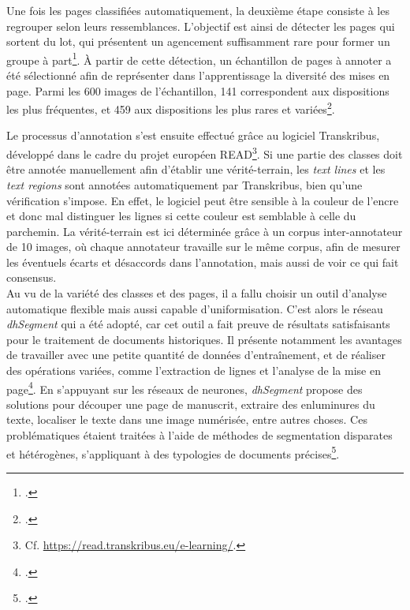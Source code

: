 \documentclass[a4paper,12pt,twoside]{book}
\begin{document}
    Une fois les pages classifiées automatiquement, la deuxième étape consiste à les regrouper selon leurs ressemblances. L'objectif est ainsi de détecter les pages qui sortent du lot, qui présentent un agencement suffisamment rare pour former un groupe à part\footcite[p. 8]{annotated_dataset_book_hours}. À partir de cette détection, un échantillon de pages à annoter a été sélectionné afin de représenter dans l'apprentissage la diversité des mises en page. Parmi les 600 images de l'échantillon, 141 correspondent aux dispositions les plus fréquentes, et 459 aux dispositions les plus rares et variées\footcite[p. 8]{annotated_dataset_book_hours}. 
    
    Le processus d'annotation s'est ensuite effectué grâce au logiciel Transkribus, développé dans le cadre du projet européen READ\footnote{Cf. \url{https://read.transkribus.eu/e-learning/}.}. Si une partie des classes doit être annotée manuellement afin d'établir une vérité-terrain, les \textit{text lines} et les \textit{text regions} sont annotées automatiquement par Transkribus, bien qu'une vérification s'impose. En effet, le logiciel peut être sensible à la couleur de l’encre et donc mal distinguer les lignes si cette couleur est semblable à celle du parchemin. La vérité-terrain est ici déterminée grâce à un corpus inter-annotateur de 10 images, où chaque annotateur travaille sur le même corpus, afin de mesurer les éventuels écarts et désaccords dans l'annotation, mais aussi de voir ce qui fait consensus. \\
    
    Au vu de la variété des classes et des pages, il a fallu choisir un outil d'analyse automatique flexible mais aussi capable d'uniformisation. C'est alors le réseau \textit{dhSegment} qui a été adopté, car cet outil a fait preuve de résultats satisfaisants pour le traitement de documents historiques. Il présente notamment les avantages de travailler avec une petite quantité de données d'entraînement, et de réaliser des opérations variées, comme l'extraction de lignes et l'analyse de la mise en page\footcite[p. 9]{annotated_dataset_book_hours}. En s'appuyant sur les réseaux de neurones, \textit{dhSegment} propose des solutions pour découper une page de manuscrit, extraire des enluminures du texte, localiser le texte dans une image numérisée, entre autres choses. Ces problématiques étaient traitées à l'aide de méthodes de segmentation disparates et hétérogènes, s'appliquant à des typologies de documents précises\footcite[p. 1]{deep_learning_segmentation}. 
    
\end{document}
